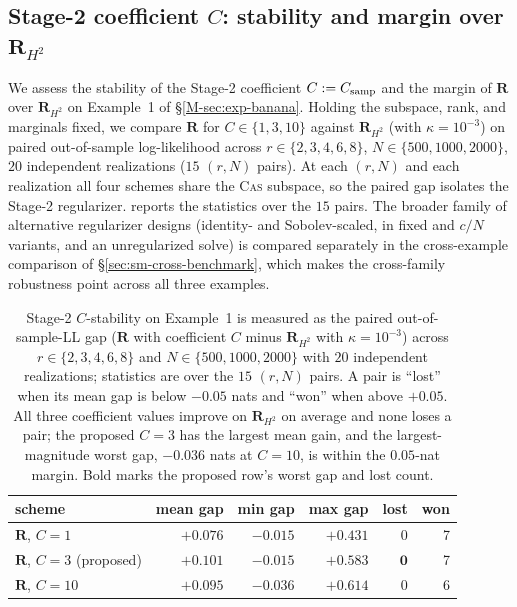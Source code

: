 \documentclass[supplement,review,hidelinks,onefignum,onetabnum]{siamart251216}
\newcommand{\mR}{\bm{R}}
\begin{document}
\subsection{\texorpdfstring{Stage-2 coefficient $C$: stability and margin over $\mR_{H^2}$}{Stage-2 coefficient C: stability}}
\label{sec:sm2-tr-ablations}

We assess the stability of the Stage-2 coefficient $C := C_{\rm samp}$ and the margin of $\mR$ over $\mR_{H^2}$ on Example~1 of \S\ref{M-sec:exp-banana}. Holding the subspace, rank, and marginals fixed, we compare $\mR$ for $C \in \{1, 3, 10\}$ against $\mR_{H^2}$ (with $\kappa = 10^{-3}$) on paired out-of-sample log-likelihood across $r \in \{2,3,4,6,8\}$, $N \in \{500,1000,2000\}$, $20$ independent realizations ($15$ $(r, N)$ pairs). At each $(r, N)$ and each realization all four schemes share the \textsc{Cas} subspace, so the paired gap isolates the Stage-2 regularizer.  reports the statistics over the $15$ pairs. The broader family of alternative regularizer designs (identity- and Sobolev-scaled, in fixed and $c/N$ variants, and an unregularized solve) is compared separately in the cross-example comparison of \S\ref{sec:sm-cross-benchmark}, which makes the cross-family robustness point across all three examples.

\begin{table}[h]
\centering\small
\caption{Stage-2 $C$-stability on Example~1 is measured as the paired out-of-sample-LL gap ($\mR$ with coefficient $C$ minus $\mR_{H^2}$ with $\kappa = 10^{-3}$) across $r \in \{2,3,4,6,8\}$ and $N \in \{500,1000,2000\}$ with $20$ independent realizations; statistics are over the $15$ $(r, N)$ pairs. A pair is ``lost'' when its mean gap is below $-0.05$ nats and ``won'' when above $+0.05$. All three coefficient values improve on $\mR_{H^2}$ on average and none loses a pair; the proposed $C=3$ has the largest mean gain, and the largest-magnitude worst gap, $-0.036$ nats at $C=10$, is within the $0.05$-nat margin. Bold marks the proposed row's worst gap and lost count.}
\label{tab:s2reg-ablations}
\begin{tabular}{l|rrr|rr}
\toprule
scheme & mean gap & min gap & max gap & lost & won \\
\midrule
$\mR$, $C=1$  & $+0.076$ & $-0.015$ & $+0.431$ & 0 & 7 \\
$\mR$, $C=3$ (proposed) & $+0.101$ & $\mathbf{-0.015}$ & $+0.583$ & $\mathbf{0}$ & 7 \\
$\mR$, $C=10$ & $+0.095$ & $-0.036$ & $+0.614$ & 0 & 6 \\
\bottomrule
\end{tabular}
\end{table}
\end{document}
